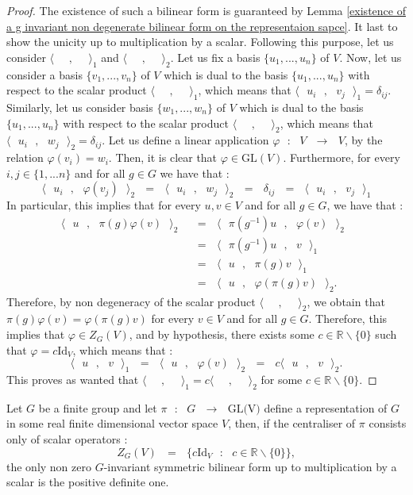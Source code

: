 \documentclass[envcountsame,envcountchap]{svmono}
\newcommand{\R}{\mathbb R}
\newcommand{\prods}[2]{\langle\qq #1\qq,\qq#2\qq\rangle}
\newcommand{\qq}{\text{ }}
\newcommand{\fctt}[2]{\qq:\qq#1\qq\rightarrow\qq#2}
\begin{document}
\begin{proof}
	The existence of such a bilinear form is guaranteed by Lemma \ref{existence of a g invariant non degenerate bilinear form on the representaion sapce}. It last to show the unicity up to multiplication by a scalar. Following this purpose, let us consider $\prods{}{}_1$ and $\prods{}{}_2$. Let us fix a basis $\{u_1,...,u_n\}$ of $V$. Now, let us consider a basis $\{v_1,...,v_n\}$ of $V$ which is dual to the basis $\{u_1,...,u_n\}$ with respect to the scalar product $\prods{}{}_1$, which means that $\prods{u_i}{v_j}_1=\delta_{ij}$. Similarly, let us consider basis $\{w_1,...,w_n\}$ of $V$ which is dual to the basis $\{u_1,...,u_n\}$ with respect to the scalar product $\prods{}{}_2$, which means that $\prods{u_i}{w_j}_2=\delta_{ij}$. Let us define a linear application $\varphi\fctt{V}{V}$, by the relation $\varphi(v_i)=w_i$. Then, it is clear that $\varphi\in \mbox{GL}(V)$. Furthermore, for every $i,j\in \{1,...n\}$ and for all $g\in G$ we have that :
	\begin{equation}
	\prods{u_i}{\varphi(v_j)}_2\qq=\qq \prods{u_i}{w_j}_2\qq=\qq \delta_{ij}\qq=\qq\prods{u_i}{v_j}_1
	\end{equation}
	In particular, this implies that for every $u,v\in V$ and for all $g\in G$, we have that :
	\begin{equation}
	\begin{split}
	\prods{u}{\pi(g)\varphi(v)}_2\qq&=\qq \prods{\pi(g^{-1})u}{\varphi(v)}_2\qq\\
	&= \qq \prods{\pi(g^{-1})u}{v}_1\\
	&=\qq  \prods{u}{\pi(g)v}_1\\
	&=\qq  \prods{u}{\varphi(\pi(g)v)}_2.
	\end{split}
	\end{equation}
	Therefore, by non degeneracy of the scalar product $\prods{}{}_2$, we obtain that $\pi(g)\varphi(v)=\varphi(\pi(g)v)$ for every $v\in V$ and for all $g\in G$. Therefore, this implies that $\varphi\in Z_G(V)$, and by hypothesis, there exists some $c\in \R\backslash\{0\}$ such that $\varphi=c\mbox{Id}_V$, which means that :
	\begin{equation}
	\prods{u}{v}_1\qq=\qq\prods{u}{\varphi(v)}_2\qq=\qq c\prods{u}{v}_2.
	\end{equation}
	This proves as wanted that $\prods{}{}_1=c\prods{}{}_2$ for some $c\in \R\backslash\{0\}$.
\end{proof}
\begin{proposition}\label{la seule form G invariante non nul est positve si jamais on a un centralizer scalaire}
	Let $G$ be a finite group and let $\pi \fctt{G}{\mbox{GL(V)}}$ define a representation of $G$ in some real finite dimensional vector space $V$, then, if the centraliser of $\pi$ consists only of scalar operators :
	\begin{equation}
	Z_G(V)\qq=\qq \{c\mbox{Id}_V\qq :\qq c\in \R\backslash\{0\}\},
	\end{equation}
	the only non zero $G$-invariant symmetric bilinear form up to multiplication by a scalar is the positive definite one.
\end{proposition}
\end{document}
